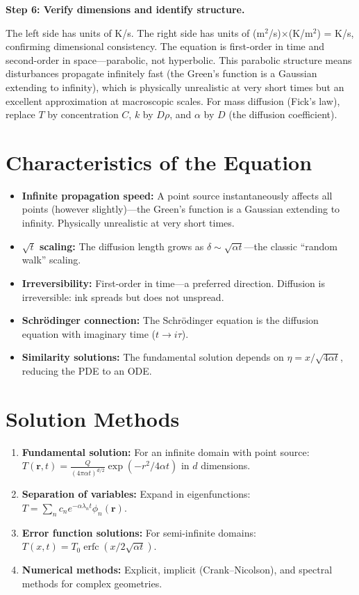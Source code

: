 \textbf{Step 6: Verify dimensions and identify structure.}

The left side has units of K/s. The right side has units of (m$^2$/s)$\times$(K/m$^2$) = K/s, confirming dimensional consistency. The equation is first-order in time and second-order in space---parabolic, not hyperbolic. This parabolic structure means disturbances propagate infinitely fast (the Green's function is a Gaussian extending to infinity), which is physically unrealistic at very short times but an excellent approximation at macroscopic scales. For mass diffusion (Fick's law), replace $T$ by concentration $C$, $k$ by $D\rho$, and $\alpha$ by $D$ (the diffusion coefficient).

\section*{Characteristics of the Equation}

\begin{itemize}
\item \textbf{Infinite propagation speed:} A point source instantaneously affects all points (however slightly)---the Green's function is a Gaussian extending to infinity. Physically unrealistic at very short times.
\item \textbf{$\sqrt{t}$ scaling:} The diffusion length grows as $\delta \sim \sqrt{\alpha t}$---the classic ``random walk'' scaling.
\item \textbf{Irreversibility:} First-order in time---a preferred direction. Diffusion is irreversible: ink spreads but does not unspread.
\item \textbf{Schr\"odinger connection:} The Schr\"odinger equation is the diffusion equation with imaginary time ($t \to i\tau$).
\item \textbf{Similarity solutions:} The fundamental solution depends on $\eta = x/\sqrt{4\alpha t}$, reducing the PDE to an ODE.
\end{itemize}
\section*{Solution Methods}

\begin{enumerate}
\item \textbf{Fundamental solution:} For an infinite domain with point source: $T(\mathbf{r}, t) = \frac{Q}{(4\pi \alpha t)^{d/2}} \exp(-r^2 / 4\alpha t)$ in $d$ dimensions.
\item \textbf{Separation of variables:} Expand in eigenfunctions: $T = \sum_n c_n e^{-\alpha \lambda_n t} \phi_n(\mathbf{r})$.
\item \textbf{Error function solutions:} For semi-infinite domains: $T(x, t) = T_0 \operatorname{erfc}(x / 2\sqrt{\alpha t})$.
\item \textbf{Numerical methods:} Explicit, implicit (Crank--Nicolson), and spectral methods for complex geometries.
\end{enumerate}
